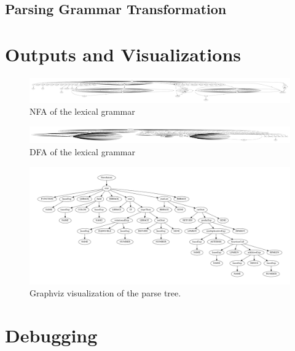 \subsection{Parsing Grammar Transformation} \label{parsing_grammar_transformation}
\section{Outputs and Visualizations} \label{outputs_and_visualizations}

\begin{figure}[t]
\includegraphics[width=\linewidth]{images/nfa.png}
\caption{NFA of the lexical grammar}
\label{fig:nfa}
\end{figure}

\begin{figure}[t]
\includegraphics[width=\linewidth]{images/dfa.png}
\caption{DFA of the lexical grammar}
\label{fig:dfa}
\end{figure}

\begin{figure}[t]
\includegraphics[width=\linewidth]{images/ptree.png}
\caption{Graphviz visualization of the parse tree.}
\label{fig:parse_tree}
\end{figure}

\section{Debugging} \label{debugging}
